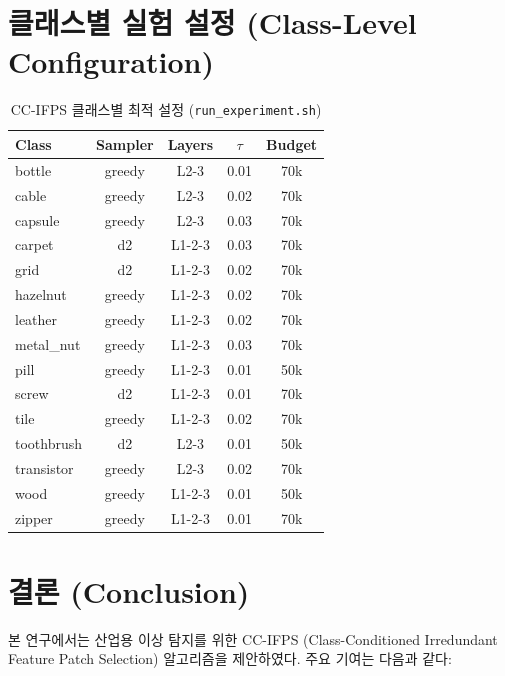 \documentclass[11pt,a4paper]{article}
\begin{document}
\section{클래스별 실험 설정 (Class-Level Configuration)}

\begin{table}[H]
\centering
\caption{CC-IFPS 클래스별 최적 설정 (\texttt{run\_experiment.sh})}
\label{tab:class_config}
\small
\begin{tabular}{l c c c c}
\toprule
\textbf{Class} & \textbf{Sampler} & \textbf{Layers} & $\tau$ & \textbf{Budget} \\
\midrule
bottle       & greedy & L2-3 & 0.01 & 70k \\
cable        & greedy & L2-3 & 0.02 & 70k \\
capsule      & greedy & L2-3 & 0.03 & 70k \\
carpet       & d2     & L1-2-3 & 0.03 & 70k \\
grid         & d2     & L1-2-3 & 0.02 & 70k \\
hazelnut     & greedy & L1-2-3 & 0.02 & 70k \\
leather      & greedy & L1-2-3 & 0.02 & 70k \\
metal\_nut   & greedy & L1-2-3 & 0.03 & 70k \\
pill         & greedy & L1-2-3 & 0.01 & 50k \\
screw        & d2     & L1-2-3 & 0.01 & 70k \\
tile         & greedy & L1-2-3 & 0.02 & 70k \\
toothbrush   & d2     & L2-3 & 0.01 & 50k \\
transistor   & greedy & L2-3 & 0.02 & 70k \\
wood         & greedy & L1-2-3 & 0.01 & 50k \\
zipper       & greedy & L1-2-3 & 0.01 & 70k \\
\bottomrule
\end{tabular}
\end{table}


\section{결론 (Conclusion)}

본 연구에서는 산업용 이상 탐지를 위한 CC-IFPS (Class-Conditioned Irredundant Feature Patch Selection) 알고리즘을 제안하였다.
주요 기여는 다음과 같다:
\end{document}
